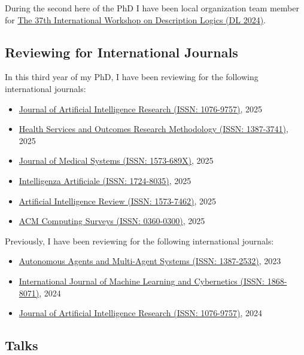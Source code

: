 \documentclass[11pt]{article}
\begin{document}
During the second here of the PhD I have been local organization team member for \href{https://dl2024.w.uib.no/organization/}{The 37th International Workshop on Description Logics (DL 2024)}.


\subsection{Reviewing for International Journals}\label{subsec:reviewing-for-international-journals}

In this third year of my PhD, I have been reviewing for the following international journals:
%
\begin{itemize}
	\item \href{https://www.jair.org/index.php/jair/index}{Journal of Artificial Intelligence Research (ISSN: 1076-9757)}, 2025
	\item \href{https://link.springer.com/journal/10742}{Health Services and Outcomes Research Methodology (ISSN: 1387-3741)}, 2025
	\item \href{https://link.springer.com/journal/10916}{Journal of Medical Systems (ISSN: 1573-689X)}, 2025
	\item \href{https://journals.sagepub.com/home/INA}{Intelligenza Artificiale (ISSN: 1724-8035)}, 2025
	\item \href{https://link.springer.com/journal/10462}{Artificial Intelligence Review (ISSN: 1573-7462)}, 2025
	\item \href{https://dl.acm.org/journal/csur}{ACM Computing Surveys (ISSN: 0360-0300)}, 2025
\end{itemize}

Previously, I have been reviewing for the following international journals:
%
\begin{itemize}
	\item \href{https://link.springer.com/journal/10458}{Autonomous Agents and Multi-Agent Systems (ISSN: 1387-2532)}, 2023
	\item \href{https://link.springer.com/journal/13042}{International Journal of Machine Learning and Cybernetics (ISSN: 1868-8071)}, 2024
	\item \href{https://www.jair.org/index.php/jair/index}{Journal of Artificial Intelligence Research (ISSN: 1076-9757)}, 2024
\end{itemize}


\subsection{Talks}\label{subsec:talks}
\end{document}
